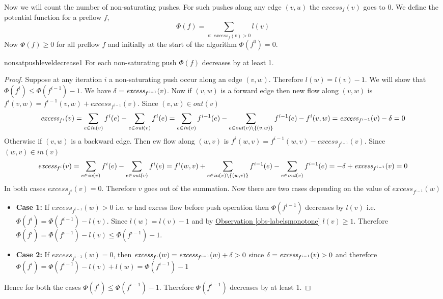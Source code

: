 Now we will count the number of non-saturating pushes. For such pushes along any edge $(v,u)$ the $\textit{excess}_f(v)$ goes to $0$. We define the potential function for a preflow $f$, $$\Phi(f)=\sum_{v:\textit{ excess}_f(v)>0}l(v)$$Now $\Phi(f)\geq 0$ for all preflow $f$ and initially at the start of the algorithm $\Phi(f^0)=0$. 

\begin{lemma}{}{nonsatpushleveldecrease1}
	For each non-saturating push  $\Phi(f)$ decreases by at least 1.
\end{lemma}
\begin{proof}
	Suppose 	at any iteration $i$  a non-saturating push occur along an edge $(v,w)$. Therefore $l(w)=l(v)-1$. We will show that $\Phi(f^i)\leq \Phi(f^{i-1})-1$.		We have $\delta=\textit{excess}_{f^{i-1}}(v)$. Now if $(v,w)$ is a forward edge then new flow along $(v,w)$ is $f^i(v,w)=f^{i-1}(v,w)+\textit{excess}_{f^{i-1}}(v)$. Since $(v,w)\in \textit{out}(v)$ 
		$$\textit{excess}_{f^i}(v)=\sum_{e\in \textit{in}(v)}f^i(e)-\sum_{e\in \textit{out}(v)}f^i(e)=          \sum_{e\in \textit{in}(v)}f^{i-1}(e)-\sum_{e\in \textit{out}(v)\setminus\{(v,w)\}}f^{i-1}(e)-f^i(v,w)  =   \textit{excess}_{f^{i-1}}(v)-\delta=0$$ Otherwise if $(v,w)$ is a backward edge. Then  ew flow along $(w,v)$ is  $f^i(w,v)=f^{i-1}(w,v)-\textit{excess}_{f^{i-1}}(v)$. Since $(w,v)\in \textit{in}(v)$ $$\textit{excess}_{f^i}(v)=\sum_{e\in \textit{in}(v)}f^i(e)-\sum_{e\in \textit{out}(v)}f^i(e)=    f^{i}(w,v) +     \sum_{e\in \textit{in}(v)\setminus\{(w,v)\}}f^{i-1}(e)-\sum_{e\in \textit{out}(v)}f^{i-1}(e)  =  -\delta+ \textit{excess}_{f^{i-1}}(v)=0$$In both cases $\textit{excess}_{f^i}(v)=0$. Therefore 	 $v$ goes out of the summation. 		Now there are two cases depending on the value of $\textit{excess}_{f^{i-1}}(w)$\begin{itemize}[label=$\bullet$]
			\item \textbf{Case 1:}
		If $\textit{excess}_{f^{i-1}}(w)>0$ i.e. $w$ had excess flow before push operation then $\Phi(f^{i-1})$ decreases by $l(v)$ i.e. $\Phi(f^i)=\Phi(f^{i-1})-l(v)$. Since $l(w)=l(v)-1$ and by  \hyperref[obs-labelsmonotone]{Observation \ref{obs-labelsmonotone}} $l(v)\geq 1$. Therefore $\Phi(f^i)=\Phi(f^{i-1})-l(v)\leq \Phi(f^{i-1})-1$.
	\item \textbf{Case 2:}	If $\textit{excess}_{f^{i-1}}(w)=0$, then $\textit{excess}_{f^i}(w)=\textit{excess}_{f^{i-1}}(w)+\delta>0$ since $\delta=\textit{excess}_{f^{i-1}}(v)>0$ and therefore $\Phi(f^i)=\Phi(f^{i-1})-l(v)+l(w)=\Phi(f^{i-1})-1$
		\end{itemize}
Hence for both the cases $\Phi(f^i)\leq \Phi(f^{i-1})-1$. Therefore $\Phi(f^{i-1})$ decreases by at least 1.
\end{proof}


